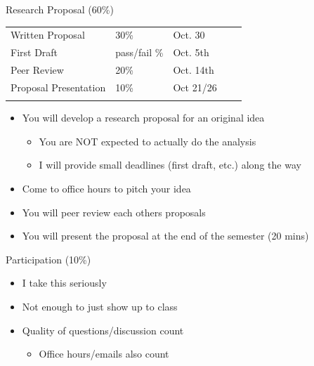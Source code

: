 \documentclass[
  ignorenonframetext,
  aspectratio=169]{beamer}
\providecommand{\tightlist}{%
  \setlength{\itemsep}{0pt}\setlength{\parskip}{0pt}}
\begin{document}
\begin{frame}{Research Proposal (60\%)}
\protect\hypertarget{research-proposal-60}{}
\begin{table}[]
\begin{tabular}{lllll}
Written Proposal      & 30\% & Oct. 30  &  &  \\
First Draft      & pass/fail \% & Oct. 5th  &  &  \\
Peer Review           & 20\% & Oct. 14th  &  &  \\
Proposal Presentation & 10\% & Oct 21/26  &  &  \\
                      &      &  &  & 
\end{tabular}
\end{table}

\begin{itemize}
\item
  You will develop a research proposal for an original idea

  \begin{itemize}
  \tightlist
  \item
    You are NOT expected to actually do the analysis\\
  \item
    I will provide small deadlines (first draft, etc.) along the way
  \end{itemize}
\item
  Come to office hours to pitch your idea
\item
  You will peer review each others proposals
\item
  You will present the proposal at the end of the semester (20 mins)
\end{itemize}
\end{frame}

\begin{frame}{Participation (10\%)}
\protect\hypertarget{participation-10}{}
\begin{itemize}
\item
  I take this seriously
\item
  Not enough to just show up to class
\item
  Quality of questions/discussion count

  \begin{itemize}
  \tightlist
  \item
    Office hours/emails also count
  \end{itemize}
\end{itemize}
\end{frame}
\end{document}
